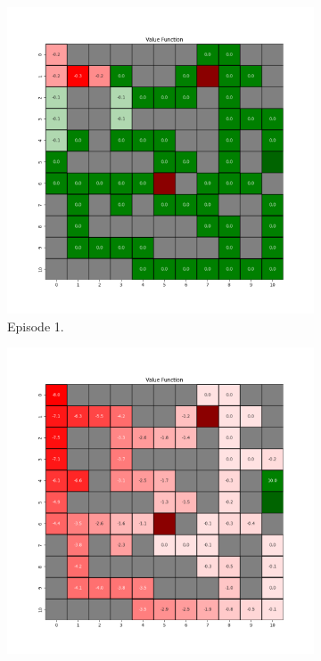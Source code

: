 \documentclass{assignment}
\begin{document}
\begin{figure}[H]
    \begin{subfigure}{0.3\textwidth}
        \includegraphics[width=\textwidth]{figures/value_q/epsilon_sweep/value_function_alpha_0.1_gamma_0.95_epsilon_1.0_iteration_1.png}
    \caption{Episode 1.}
    \end{subfigure}\hfill
    \begin{subfigure}{0.3\textwidth}
        \includegraphics[width=\textwidth]{figures/value_q/epsilon_sweep/value_function_alpha_0.1_gamma_0.95_epsilon_1.0_iteration_50.png}

\end{subfigure}
\end{figure}
\end{document}
